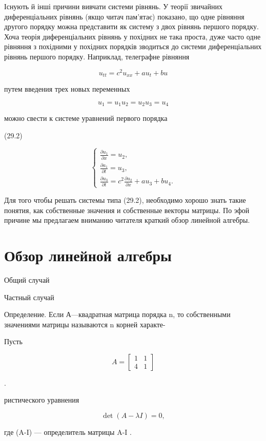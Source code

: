 \documentclass[
  ukrainian,
]{article}
\begin{document}
Існують й інші причини вивчати системи рівнянь. У теорії звичайних
диференціальних рівнянь (якщо читач пам'ятає) показано, що одне рівняння
другого порядку можна представити як систему з двох рівнянь першого
порядку. Хоча теорія диференціальних рівнянь у похідних не така проста,
дуже часто одне рівняння з похідними у похідних порядків зводиться до
системи диференціальних рівнянь першого порядку. Наприклад, телеграфне
рівняння

\[
u_{tt} = c^2 u_{xx} + a u_t + b u
\]

путем введения трех новых переменных

\[
u_1 = u_1
u_2 = u_2
u_3 = u_4
\]

можно свести к системе уравнений первого порядка

(29.2)

\[
\begin{cases} \frac{\partial u_1}{\partial x} = u_2, \\ \frac{\partial a_1}{\partial t} = u_3, \\ \frac{\partial u_3}{\partial t} = c^2 \frac{\partial u_2}{\partial x} + au_3 + bu_4. \end{cases}
\]

Для того чтобы решать системы типа (29.2), необходимо хорошо знать такие
понятия, как собственные значения и собственные векторы матрицы. По эфой
причине мы предлагаем вниманию читателя краткий обзор линейной алгебры.

\section{Обзор линейной
алгебры}\label{ux43eux431ux437ux43eux440-ux43bux438ux43dux435ux439ux43dux43eux439-ux430ux43bux433ux435ux431ux440ux44b}

Общий случай

Частный случай

Определение. Если А---квадратная матрица порядка n, то собственными
значениями матрицы называются n корней характе-

Пусть

\[
A =
\begin{bmatrix} 1 & 1 \\ 4 & 1 \end{bmatrix}
\]

.

ристического уравнения

\[
\det\left(A-\lambda I\right)=0,
\]

где \det(A-\lambda I) --- определитель матрицы A-\lambda I .
\end{document}
